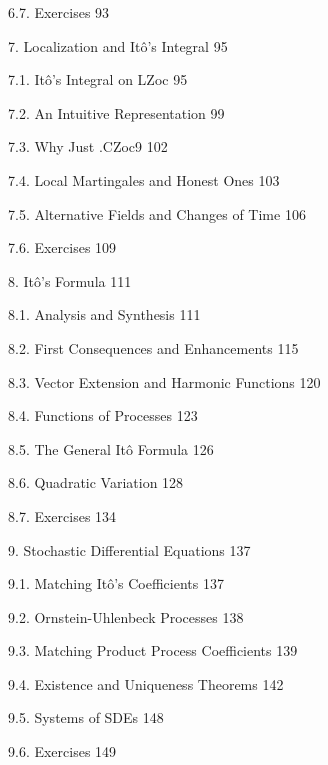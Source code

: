 6.7. Exercises 93



7. Localization and Itô's Integral 95



7.1. Itô's Integral on LZoc 95



7.2. An Intuitive Representation 99



7.3. Why Just .CZoc9 102



7.4. Local Martingales and Honest Ones 103



7.5. Alternative Fields and Changes of Time 106



7.6. Exercises 109



8. Itô's Formula 111



8.1. Analysis and Synthesis 111



8.2. First Consequences and Enhancements 115



8.3. Vector Extension and Harmonic Functions 120



8.4. Functions of Processes 123



8.5. The General Itô Formula 126



8.6. Quadratic Variation 128



8.7. Exercises 134



9. Stochastic Differential Equations 137



9.1. Matching Itô's Coefficients 137



9.2. Ornstein-Uhlenbeck Processes 138



9.3. Matching Product Process Coefficients 139



9.4. Existence and Uniqueness Theorems 142



9.5. Systems of SDEs 148



9.6. Exercises 149




